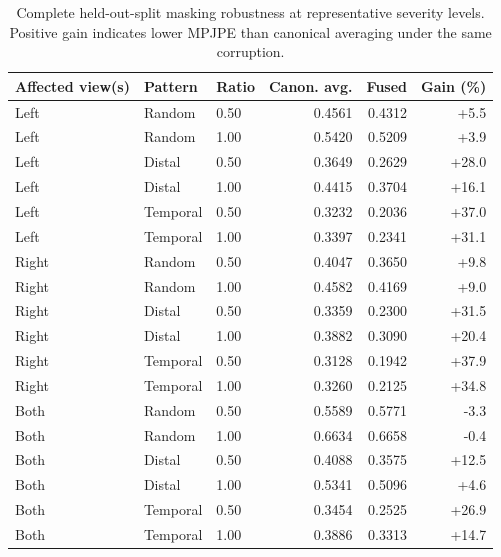 \begin{table}[t]
\centering
\caption{Complete held-out-split masking robustness at representative severity levels. Positive gain indicates lower MPJPE than canonical averaging under the same corruption.}
\label{tab:masking_extension}
\small
\begin{tabular}{lllrrr}
\toprule
Affected view(s) & Pattern & Ratio & Canon. avg. & Fused & Gain (\%) \\
\midrule
Left & Random & 0.50 & 0.4561 & 0.4312 & +5.5 \\
Left & Random & 1.00 & 0.5420 & 0.5209 & +3.9 \\
Left & Distal & 0.50 & 0.3649 & 0.2629 & +28.0 \\
Left & Distal & 1.00 & 0.4415 & 0.3704 & +16.1 \\
Left & Temporal & 0.50 & 0.3232 & 0.2036 & +37.0 \\
Left & Temporal & 1.00 & 0.3397 & 0.2341 & +31.1 \\
\midrule
Right & Random & 0.50 & 0.4047 & 0.3650 & +9.8 \\
Right & Random & 1.00 & 0.4582 & 0.4169 & +9.0 \\
Right & Distal & 0.50 & 0.3359 & 0.2300 & +31.5 \\
Right & Distal & 1.00 & 0.3882 & 0.3090 & +20.4 \\
Right & Temporal & 0.50 & 0.3128 & 0.1942 & +37.9 \\
Right & Temporal & 1.00 & 0.3260 & 0.2125 & +34.8 \\
\midrule
Both & Random & 0.50 & 0.5589 & 0.5771 & -3.3 \\
Both & Random & 1.00 & 0.6634 & 0.6658 & -0.4 \\
Both & Distal & 0.50 & 0.4088 & 0.3575 & +12.5 \\
Both & Distal & 1.00 & 0.5341 & 0.5096 & +4.6 \\
Both & Temporal & 0.50 & 0.3454 & 0.2525 & +26.9 \\
Both & Temporal & 1.00 & 0.3886 & 0.3313 & +14.7 \\
\bottomrule
\end{tabular}
\end{table}
